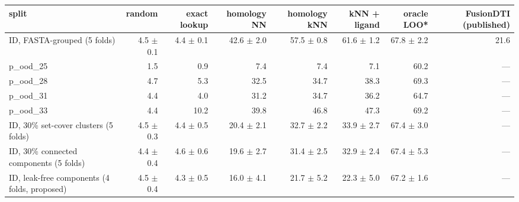 \begin{tabular}{lrrrrrrr}
\toprule
split & random & exact lookup & homology NN & homology kNN & kNN + ligand & oracle LOO* & FusionDTI (published) \\ \midrule
ID, FASTA-grouped (5 folds) & 4.5 $\pm$ 0.1 & 4.4 $\pm$ 0.1 & 42.6 $\pm$ 2.0 & 57.5 $\pm$ 0.8 & 61.6 $\pm$ 1.2 & 67.8 $\pm$ 2.2 & 21.6 \\
p\_ood\_25 & 1.5 & 0.9 & 7.4 & 7.4 & 7.1 & 60.2 & — \\
p\_ood\_28 & 4.7 & 5.3 & 32.5 & 34.7 & 38.3 & 69.3 & — \\
p\_ood\_31 & 4.4 & 4.0 & 31.2 & 34.7 & 36.2 & 64.7 & — \\
p\_ood\_33 & 4.4 & 10.2 & 39.8 & 46.8 & 47.3 & 69.2 & — \\
ID, 30\% set-cover clusters (5 folds) & 4.5 $\pm$ 0.3 & 4.4 $\pm$ 0.5 & 20.4 $\pm$ 2.1 & 32.7 $\pm$ 2.2 & 33.9 $\pm$ 2.7 & 67.4 $\pm$ 3.0 & — \\
ID, 30\% connected components (5 folds) & 4.4 $\pm$ 0.4 & 4.6 $\pm$ 0.6 & 19.6 $\pm$ 2.7 & 31.4 $\pm$ 2.5 & 32.9 $\pm$ 2.4 & 67.4 $\pm$ 5.3 & — \\
ID, leak-free components (4 folds, proposed) & 4.5 $\pm$ 0.4 & 4.3 $\pm$ 0.5 & 16.0 $\pm$ 4.1 & 21.7 $\pm$ 5.2 & 22.3 $\pm$ 5.0 & 67.2 $\pm$ 1.6 & — \\
\bottomrule
\end{tabular}
